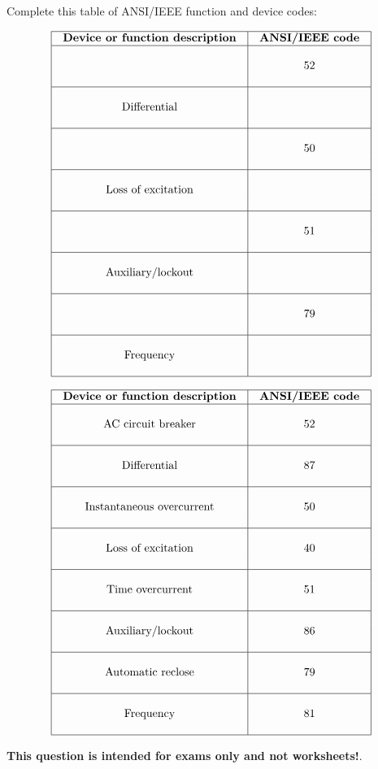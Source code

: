 

Complete this table of ANSI/IEEE function and device codes:


$$\vbox{\offinterlineskip
\halign{\strut
\vrule \quad\hfil # \ \hfil & 
\vrule \quad\hfil # \ \hfil \vrule \cr
\noalign{\hrule}
%
{\bf Device or function description} & {\bf ANSI/IEEE code} \cr
%
\noalign{\hrule}
%
 &  \cr
 & 52 \cr
 &  \cr
%
\noalign{\hrule}
%
 &  \cr
Differential &  \cr
 &  \cr
%
\noalign{\hrule}
%
 &  \cr
 & 50 \cr
 &  \cr
%
\noalign{\hrule}
%
 &  \cr
Loss of excitation &  \cr
 &  \cr
%
\noalign{\hrule}
%
 &  \cr
 & 51 \cr
 &  \cr
%
\noalign{\hrule}
%
 &  \cr
Auxiliary/lockout &  \cr
 &  \cr
%
\noalign{\hrule}
%
 &  \cr
 & 79 \cr
 &  \cr
%
\noalign{\hrule}
%
 &  \cr
Frequency &  \cr
 &  \cr
%
\noalign{\hrule}
} %
}$$ %









$$\vbox{\offinterlineskip
\halign{\strut
\vrule \quad\hfil # \ \hfil & 
\vrule \quad\hfil # \ \hfil \vrule \cr
\noalign{\hrule}
%
{\bf Device or function description} & {\bf ANSI/IEEE code} \cr
%
\noalign{\hrule}
%
 &  \cr
AC circuit breaker & 52 \cr
 &  \cr
%
\noalign{\hrule}
%
 &  \cr
Differential & 87 \cr
 &  \cr
%
\noalign{\hrule}
%
 &  \cr
Instantaneous overcurrent & 50 \cr
 &  \cr
%
\noalign{\hrule}
%
 &  \cr
Loss of excitation & 40 \cr
 &  \cr
%
\noalign{\hrule}
%
 &  \cr
Time overcurrent & 51 \cr
 &  \cr
%
\noalign{\hrule}
%
 &  \cr
Auxiliary/lockout & 86 \cr
 &  \cr
%
\noalign{\hrule}
%
 &  \cr
Automatic reclose & 79 \cr
 &  \cr
%
\noalign{\hrule}
%
 &  \cr
Frequency & 81 \cr
 &  \cr
%
\noalign{\hrule}
} %
}$$ %







{\bf This question is intended for exams only and not worksheets!}.



